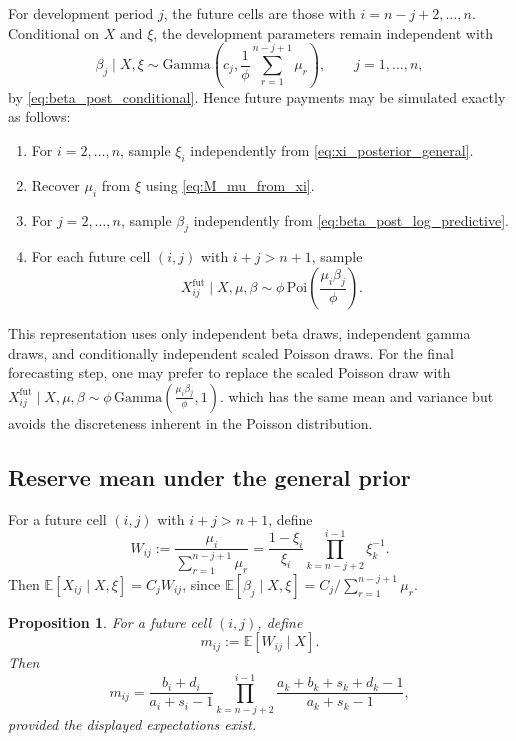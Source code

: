 \documentclass[11pt]{article}
\newtheorem{proposition}[theorem]{Proposition}
\newcommand{\E}{\mathbb{E}}
\newcommand{\1}{\mathbf{1}}
\newcommand{\GammaD}{\mathrm{Gamma}}
\begin{document}
For development period $j$, the future cells are those with $i=n-j+2,\dots,n$.
Conditional on $X$ and $\xi$, the development parameters remain independent with
\begin{equation}
\beta_j\mid X,\xi \sim \GammaD\!\left(c_j,\frac{1}{\phi}\sum_{r=1}^{n-j+1} \mu_r\right),
\qquad j=1,\dots,n,
\label{eq:beta_post_log_predictive}
\end{equation}
by \eqref{eq:beta_post_conditional}.
Hence future payments may be simulated exactly as follows:
\begin{enumerate}[leftmargin=2em]
\item For $i=2,\dots,n$, sample $\xi_i$ independently from \eqref{eq:xi_posterior_general}.
\item Recover $\mu_i$ from $\xi$ using \eqref{eq:M_mu_from_xi}.
\item For $j=2,\dots,n$, sample $\beta_j$ independently from \eqref{eq:beta_post_log_predictive}.
\item For each future cell $(i,j)$ with $i+j>n+1$, sample
\[
X_{ij}^{\mathrm{fut}}\mid X,\mu,\beta \sim \phi\,\mathrm{Poi}\!\left(\frac{\mu_i\beta_j}{\phi}\right).
\]
\end{enumerate}
This representation uses only independent beta draws, independent gamma draws, and conditionally independent scaled Poisson draws. For the final forecasting step, 
one may prefer to replace the scaled Poisson draw with  $X_{ij}^{\mathrm{fut}}\mid X,\mu,\beta \sim \phi\,\GammaD\!\left(\frac{\mu_i\beta_j}{\phi},1\right).$ which has the same mean and variance
but avoids the discreteness inherent in the Poisson distribution.

\subsection{Reserve mean under the general prior}

For a future cell $(i,j)$ with $i+j>n+1$, define
\begin{equation}
W_{ij}
:= \frac{\mu_i}{\sum_{r=1}^{n-j+1} \mu_r}
= \frac{1-\xi_i}{\xi_i}\prod_{k=n-j+2}^{i-1}\xi_k^{-1}.
\label{eq:W_ij}
\end{equation}
Then $\E[X_{ij}\mid X,\xi]=C_jW_{ij}$, since $\E[\beta_j\mid X,\xi]=C_j/\sum_{r=1}^{n-j+1}\mu_r$.

\begin{proposition}\label{prop:first_moment_general}
For a future cell $(i,j)$, define
\begin{equation}
m_{ij}:=\E[W_{ij}\mid X].
\label{eq:first_moment_mij_general_name}
\end{equation}
Then
\begin{equation}
m_{ij}
=
\frac{b_i+d_i}{a_i+s_i-1}
\prod_{k=n-j+2}^{i-1}
\frac{a_k+b_k+s_k+d_k-1}{a_k+s_k-1},
\label{eq:first_moment_mij_general}
\end{equation}
provided the displayed expectations exist.
\end{proposition}
\end{document}
